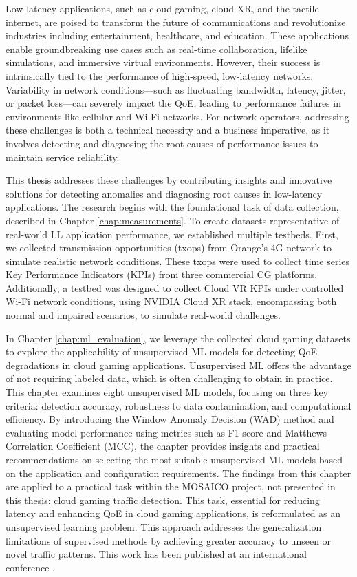 

Low-latency applications, such as cloud gaming, cloud \ac{XR}, and the tactile internet, are poised to transform the future of communications and revolutionize industries including entertainment, healthcare, and education. These applications enable groundbreaking use cases such as real-time collaboration, lifelike simulations, and immersive virtual environments. However, their success is intrinsically tied to the performance of high-speed, low-latency networks. Variability in network conditions—such as fluctuating bandwidth, latency, jitter, or packet loss—can severely impact the \ac{QoE}, leading to performance failures in environments like cellular and Wi-Fi networks. For network operators, addressing these challenges is both a technical necessity and a business imperative, as it involves detecting and diagnosing the root causes of performance issues to maintain service reliability.

This thesis addresses these challenges by contributing insights and innovative solutions for detecting anomalies and diagnosing root causes in low-latency applications. The research begins with the foundational task of data collection, described in Chapter \ref{chap:measurements}. To create datasets representative of real-world LL application performance, we established multiple testbeds. First, we collected transmission opportunities (txops) from Orange's 4G network to simulate realistic network conditions. These txops were used to collect time series Key Performance Indicators (KPIs) from three commercial CG platforms. Additionally, a testbed was designed to collect Cloud VR KPIs under controlled Wi-Fi network conditions, using NVIDIA Cloud XR stack, encompassing both normal and impaired scenarios, to simulate real-world challenges.

In Chapter \ref{chap:ml_evaluation}, we leverage the collected cloud gaming datasets to explore the applicability of unsupervised ML models for detecting QoE degradations in cloud gaming applications. Unsupervised ML offers the advantage of not requiring labeled data, which is often challenging to obtain in practice. This chapter examines eight unsupervised ML models, focusing on three key criteria: detection accuracy, robustness to data contamination, and computational efficiency. By introducing the Window Anomaly Decision (WAD) method and evaluating model performance using metrics such as F1-score and Matthews Correlation Coefficient (MCC), the chapter provides insights and practical recommendations on selecting the most suitable unsupervised ML models based on the application and configuration requirements. The findings from this chapter are applied to a practical task within the MOSAICO project, not presented in this thesis: cloud gaming traffic detection. This task, essential for reducing latency and enhancing QoE in cloud gaming applications, is reformulated as an unsupervised learning problem. This approach addresses the generalization limitations of supervised methods by achieving greater accuracy to unseen or novel traffic patterns. This work has been published at an international conference \cite{ky2023hybrid}.

